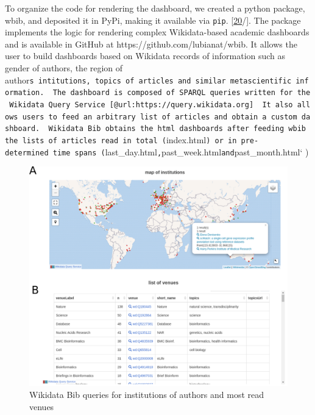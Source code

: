 To organize the code for rendering the dashboard, we created a python package, wbib, and deposited it in PyPi, making it available via \texttt{pip}. {[}\protect\hyperlink{ref-6chnW6cc}{20}/{]}.
The package implements the logic for rendering complex Wikidata-based academic dashboards and is available in GitHub at https://github.com/lubianat/wbib.
It allows the user to build dashboards based on Wikidata records of information such as gender of authors, the region of author\texttt{s\ intitutions,\ topics\ of\ articles\ and\ similar\ metascientific\ information.\ \ The\ dashboard\ is\ composed\ of\ SPARQL\ queries\ written\ for\ the\ Wikidata\ Query\ Service\ {[}@url:https://query.wikidata.org{]}\ \ It\ also\ allows\ users\ to\ feed\ an\ arbitrary\ list\ of\ articles\ and\ obtain\ a\ custom\ dashboard.\ \ Wikidata\ Bib\ obtains\ the\ html\ dashboards\ after\ feeding\ wbib\ the\ lists\ of\ articles\ read\ in\ total\ (}index.html\texttt{)\ or\ in\ pre-determined\ time\ spans\ (}last\_day.html\texttt{,}past\_week.html\texttt{and}past\_month.html` )

\begin{figure}
\hypertarget{fig:dashboard}{%
\centering
\includegraphics{images/wikidata_bib_display.png}
\caption{Wikidata Bib queries for institutions of authors and most read venues}\label{fig:dashboard}
}
\end{figure}

